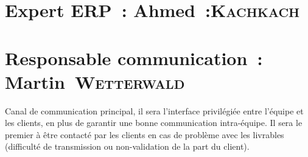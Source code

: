 \section{Expert ERP~: Ahmed~:\textsc{Kachkach}}

\section{Responsable communication~: Martin~\textsc{Wetterwald}}
Canal de communication principal, il sera l'interface privilégiée entre l'équipe et les clients, en plus de garantir une bonne communication intra-équipe. Il sera le premier à être contacté par les clients en cas de problème avec les livrables (difficulté de transmission ou non-validation de la part du client).


